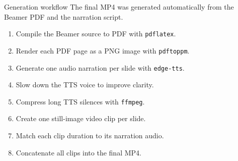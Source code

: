 \begin{frame}[t]

  \begin{block}{Generation workflow}
    The final MP4 was generated automatically from the Beamer PDF and the narration script.
  \end{block}

  \begin{enumerate}
    \item Compile the Beamer source to PDF with \texttt{pdflatex}.
    \item Render each PDF page as a PNG image with \texttt{pdftoppm}.
    \item Generate one audio narration per slide with \texttt{edge-tts}.
    \item Slow down the TTS voice to improve clarity.
    \item Compress long TTS silences with \texttt{ffmpeg}.
    \item Create one still-image video clip per slide.
    \item Match each clip duration to its narration audio.
    \item Concatenate all clips into the final MP4.
  \end{enumerate}
\end{frame}

